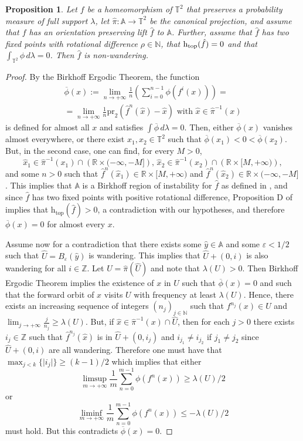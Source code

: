 \documentclass[12pt,a4paper]{amsart}
\newtheorem{prop}[thm]{Proposition}
\theoremstyle{definition}
\theoremstyle{remark}
\newcommand{\T}{\mathbb{T}}
\newcommand{\R}{\mathbb{R}}
\newcommand{\Z}{\mathbb{Z}}
\newcommand{\N}{\mathbb{N}}
\newcommand{\A}{\mathbb{A}}
\begin{document}
\begin{prop}\label{p.hamiltonianisnonwandering}
Let $f$ be a homeomorphism of $\T^2$ that preserves a probability measure of full support $\lambda$, let $\hat \pi:\A\to\T^2$ be the canonical projection, and assume that $f$ has an
orientation preserving lift $\hat f$ to $\A$. Further, assume that $\hat f$ has two fixed points with rotational difference $\rho\in\N$, that 
$\textrm{h}_{\textrm{\normalfont{top}}}(\hat f)=0$ and that $\int_{\T^2}\phi\,d\lambda=0$.
Then $\hat f$ is non-wandering. 
\end{prop}
\begin{proof}
By the Birkhoff Ergodic Theorem, the function
 $$\begin{aligned}
\overline\phi(x):=\lim_{n\to+\infty}\frac{1}{n}\left(\sum_{i=0}^{n-1}\phi(f^i(x))\right)=\\
=\lim_{n\to+\infty}\frac{1}{n} \mathrm{pr}_2(\hat f^{n}(\hat x)-\hat x)\mbox{  with } \hat x\in\hat\pi^{-1}(x)
\end{aligned}$$
 is defined for almost all $x$ and satisfies $\int\overline \phi\, d\lambda=0$. Then, either $\overline \phi(x)$ vanishes almost everywhere, or there exist $x_1, x_2 \in \T^2$ such that $\overline\phi(x_1)<0<\overline\phi(x_2)$. But, in the second case, one can find, for every $M>0$, 
 $$\hat x_1\in\hat\pi^{-1}(x_1)\cap\left(\R\times(-\infty,-M]\right),\, \hat x_2\in\hat\pi^{-1}(x_2)\cap\left(\R\times [M, +\infty)\right),$$
  and some $n>0$ such that $\hat f^n(\hat x_1)\in \R\times [M, +\infty)$ and $\hat f^n(\hat x_2)\in \R\times (-\infty, -M]$. This implies that $\A$ is a Birkhoff region of instability for $\hat f$ as defined in \cite{lecalveztal}, and since $\hat f$ has two fixed points with positive rotational difference, Proposition D  of \cite{lecalveztal} implies that $\textrm{h}_{\textrm{top}}(\hat f)>0$, a contradiction with our hypotheses, and therefore $\overline\phi(x)=0$ for almost every $x$. 

\smallskip
 
Assume now for a contradiction that there exists some $\hat y \in \A$ and some $\varepsilon<1/2$ such that $\hat U=B_{\varepsilon}(\hat y)$ is wandering. This implies that $\hat U+(0,i)$ is also wandering for all $i\in\Z$. Let $U=\hat\pi(\hat U)$ and note that $\lambda(U)>0$. Then Birkhoff Ergodic Theorem implies the existence of $x$ in $U$ such that $\overline\phi(x)=0$ and such that the forward orbit of $x$ visits $U$ with frequency at least $\lambda(U)$. Hence, there exists an increasing sequence of integers $(n_j)_{j\in\N}$ such that $f^{n_j}(x)\in U$ and $\lim_{j\to+\infty}\frac{j}{n_j}\ge\lambda(U)$. But, if $\hat x\in\hat\pi^{-1}(x)\cap \hat U$, then for each $j>0$ there exists $i_j\in\Z$ such that $\hat f^{n_j}(\hat x)$ is in $\hat U+(0,i_j)$ and $i_{j_1}\not=i_{j_2}$ if $j_1\not=j_2$ since $\hat U+(0,i)$ are all wandering. Therefore one must have that $\max_{j<k}\{\mid i_j\mid \}\ge (k-1)/2$ which implies that either
$$\limsup_{m\to+\infty}\frac{1}{m}\sum_{n=0}^{m-1}\phi(f^n(x))\ge \lambda(U)/2$$
or
$$\liminf_{m\to+\infty}\frac{1}{m}\sum_{n=0}^{m-1}\phi(f^n(x))\le -\lambda(U)/2$$
must hold. But this contradicts $\overline\phi(x)=0$.   
\end{proof}
\end{document}
